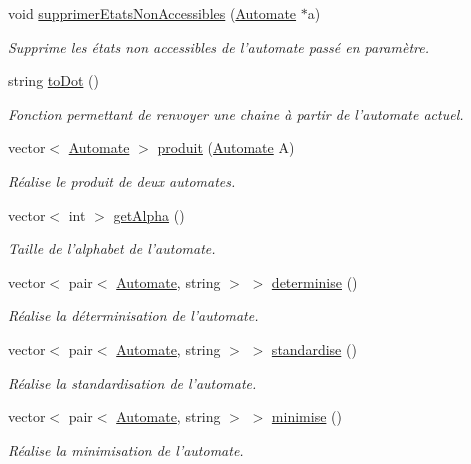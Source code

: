 \begin{DoxyCompactItemize}
void \hyperlink{class_automate_ac808d99ac1a43b37e5e7ffc95c54cd40}{supprimer\-Etats\-Non\-Accessibles} (\hyperlink{class_automate}{Automate} $\ast$a)
\begin{DoxyCompactList}\small\item\em Supprime les états non accessibles de l'automate passé en paramètre. \end{DoxyCompactList}\item 
string \hyperlink{class_automate_af1f2f1cd64780ff7b302936787aeac38}{to\-Dot} ()
\begin{DoxyCompactList}\small\item\em Fonction permettant de renvoyer une chaine à partir de l'automate actuel. \end{DoxyCompactList}\item 
vector$<$ \hyperlink{class_automate}{Automate} $>$ \hyperlink{class_automate_a0e2d212ace9f993021c9112aa99b7aed}{produit} (\hyperlink{class_automate}{Automate} A)
\begin{DoxyCompactList}\small\item\em Réalise le produit de deux automates. \end{DoxyCompactList}\item 
vector$<$ int $>$ \hyperlink{class_automate_ab18acfedc3d9704ab08d8fd464efccfe}{get\-Alpha} ()
\begin{DoxyCompactList}\small\item\em Taille de l'alphabet de l'automate. \end{DoxyCompactList}\item 
vector$<$ pair$<$ \hyperlink{class_automate}{Automate}, string $>$ $>$ \hyperlink{class_automate_aa1829f8d4512f67d4e3efb945cc550f0}{determinise} ()
\begin{DoxyCompactList}\small\item\em Réalise la déterminisation de l'automate. \end{DoxyCompactList}\item 
vector$<$ pair$<$ \hyperlink{class_automate}{Automate}, string $>$ $>$ \hyperlink{class_automate_a32ec8c518bd5d988ac10544b13c0bb95}{standardise} ()
\begin{DoxyCompactList}\small\item\em Réalise la standardisation de l'automate. \end{DoxyCompactList}\item 
vector$<$ pair$<$ \hyperlink{class_automate}{Automate}, string $>$ $>$ \hyperlink{class_automate_af8297f77add39ea70a0877f85dedcf28}{minimise} ()
\begin{DoxyCompactList}\small\item\em Réalise la minimisation de l'automate. \end{DoxyCompactList}\end{DoxyCompactItemize}
